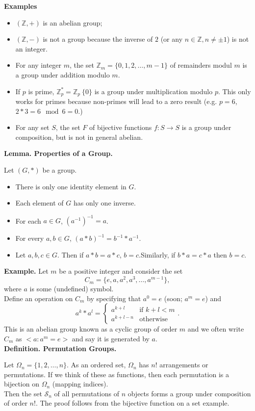 \documentclass{article}
\newcommand{\definition}[2]{\textbf{Definition. #1.}\begin{adjustwidth}{1cm}{1cm}#2\end{adjustwidth}}
\newcommand{\lemma}[2]{\textbf{Lemma. #1.}\begin{adjustwidth}{1cm}{1cm}#2\end{adjustwidth}}
\begin{document}
\textbf{Examples}\begin{itemize}
  \item $(\mathbb{Z}, +)$ is an abelian group;
  \item $(\mathbb{Z}, -)$ is not a group because the inverse of $2$ (or any $n \in \mathbb{Z}, n \neq \pm 1$) is not an integer.
  \item For any integer $m$, the set $\mathbb{Z}_m = \{0, 1, 2, \ldots, m-1\}$ of remainders modul $m$ is a group under addition modulo $m$.
  \item If $p$ is prime, $\mathbb{Z}^*_p = \mathbb{Z}_p \ \{0\}$ is a group under multiplication modulo $p$. This only works for primes because non-primes will lead to a zero result (e.g. $p = 6$, $2 * 3 = 6 \mod 6 = 0$.)
  \item For any set $S$, the set $F$ of bijective functions $f : S \rightarrow S$ is a group under composition, but is not in general abelian.
\end{itemize}
\lemma{Properties of a Group}{Let $(G, *)$ be a group.\begin{itemize}\item There is only one identity element in $G$.\item Each element of $G$ has only one inverse. \item For each $a \in G$, $(a^{-1})^{-1} = a$. \item For every $a,b \in G$, $(a * b)^{-1} = b^{-1} * a^{-1}$. \item Let $a,b,c \in G$. Then if $a * b = a * c$, $b = c$.Similarly, if $b * a = c * a$ then $b = c$.\end{itemize}}
\textbf{Example.}
Let $m$ be a positive integer and consider the set \[C_m = \{e, a, a^2, a^3, \ldots, a^{m-1}\},\]where $a$ is some (undefined) symbol.\\Define an operation on $C_m$ by specifying that $a^0 = e$ (soon; $a^m = e$) and \[a^k * a^l = \begin{cases}
  a^{k+l} & \text{if } k + l < m\\
  a^{k+l-n} & \text{otherwise}
\end{cases}.\]This is an abelian group known as a cyclic group of order $m$ and we often write $C_m$ as $<a: a^m = e>$ and say it is generated by $a$. \\[1\baselineskip]
\definition{Permutation Groups}{Let $\Omega_n = \{1, 2, \ldots,n\}$. As an ordered set, $\Omega_n$ has $n!$ arrangements or permutations. If we think of these as functions, then each permutation is a bijection on $\Omega_n$ (mapping indices).\\[1\baselineskip]Then the set $\mathcal{S}_n$ of all permutations of $n$ objects forms a group under composition of order $n!$. The proof follows from the bijective function on a set example.}
\end{document}

